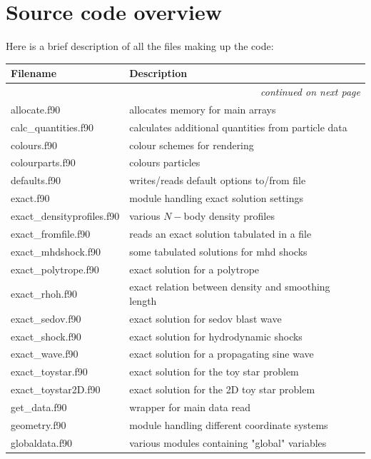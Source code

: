 \documentclass[a4paper,10pt]{article}
\begin{document}
\section{Source code overview}
Here is a brief description of all the files making up the code:
\begin{longtable}{|lp{}|}
\hline
Filename & Description \\
\hline \endhead
\multicolumn{2}{|r|}{\emph{continued on next page}} \\
\hline \endfoot
\hline \endlastfoot
     allocate.f90           & allocates memory for main arrays \\
     calc\_quantities.f90    & calculates additional quantities from particle data \\
     colours.f90            & colour schemes for rendering\\
     colourparts.f90	 & colours particles\\
     defaults.f90           & writes/reads default options to/from file\\
     exact.f90              & module handling exact solution settings\\
     exact\_densityprofiles.f90 & various $N-$body density profiles \\
     exact\_fromfile.f90     & reads an exact solution tabulated in a file\\
     exact\_mhdshock.f90     & some tabulated solutions for mhd shocks\\ 
     exact\_polytrope.f90    & exact solution for a polytrope\\
     exact\_rhoh.f90	 & exact relation between density and smoothing length\\
     exact\_sedov.f90        & exact solution for sedov blast wave\\
     exact\_shock.f90        & exact solution for hydrodynamic shocks\\
     exact\_wave.f90         & exact solution for a propagating sine wave\\
     exact\_toystar.f90      & exact solution for the toy star problem\\
     exact\_toystar2D.f90    & exact solution for the 2D toy star problem\\
     get\_data.f90           & wrapper for main data read\\
     geometry.f90           & module handling different coordinate systems\\
     globaldata.f90         & various modules containing "global" variables\\

\end{longtable}
\end{document}
